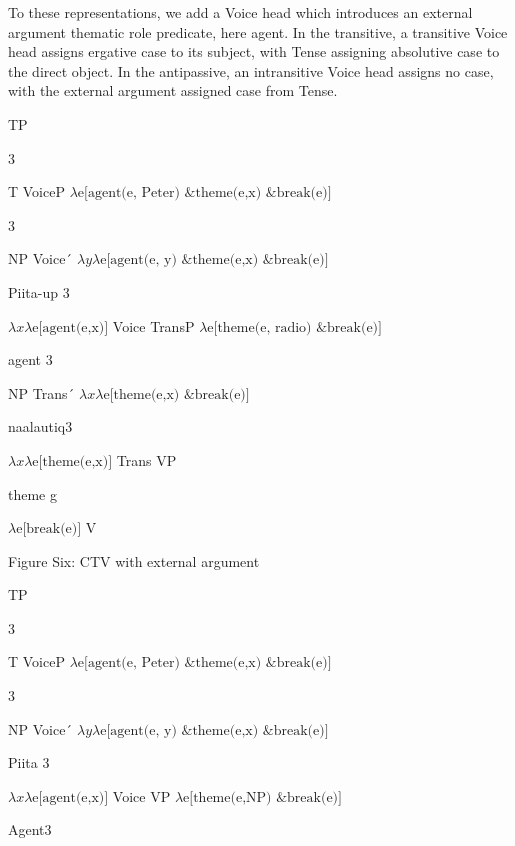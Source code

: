 \documentclass[output=paper,modfonts,nonflat]{langsci/langscibook}
\begin{document}
To these representations, we add a Voice head which introduces an external argument thematic role predicate, here agent.  In the transitive, a transitive Voice head assigns ergative case to its subject, with Tense assigning absolutive case to the direct object.  In the antipassive, an intransitive Voice head assigns no case, with the external argument assigned case from Tense.

    TP

       3

      T          VoiceP            $\lambda \text{e[}\text{agent(e, Peter) \&} \text{theme(}\text{e,x}\text{) \& break(e)]}$

                            3

    NP     Voice´   $\mathit{\lambda y\lambda} \text{e[}\text{agent(e, y) \&} \text{theme(}\text{e,x}\text{) \& break(e)]}$

        Piita-up  3

 $\mathit{\lambda x\lambda} \text{e[agent(e,x)]}$         Voice  TransP     $\lambda \text{e[theme(e, radio) \& break(e)]}$

             agent 3  

            NP        Trans´      $\mathit{\lambda x\lambda} \text{e[theme(e,x) \& break(e)]}$

      naalautiq3    

 $\mathit{\lambda x\lambda} \text{e[theme(e,x)]}$            Trans        VP

         theme           g

 $\lambda \text{e[break(e)]}$                         V

\begin{stylecaption}
Figure Six: CTV with external argument
\end{stylecaption}

    TP

     3

     T          VoiceP      $\lambda \text{e[}\text{agent(e, Peter) \&} \text{theme(}\text{e,x}\text{) \& break(e)]}$

     3

    NP     Voice´   $\mathit{\lambda y\lambda} \text{e[}\text{agent(e, y) \&} \text{theme(}\text{e,x}\text{) \& break(e)]}$

            Piita  3

 $\mathit{\lambda x\lambda} \text{e[agent(e,x)]}$         Voice     VP       $\lambda \text{e[}\text{theme(e,NP) \& break(e)]}$

            Agent3
\end{document}
